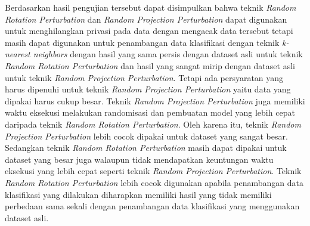 Berdasarkan hasil pengujian tersebut dapat disimpulkan bahwa teknik \textit{Random Rotation Perturbation} dan \textit{Random Projection Perturbation} dapat digunakan untuk menghilangkan privasi pada data dengan mengacak data tersebut tetapi masih dapat digunakan untuk penambangan data klasifikasi dengan teknik \textit{k-nearest neighbors} dengan hasil yang sama persis dengan dataset asli untuk teknik \textit{Random Rotation Perturbation} dan hasil yang sangat mirip dengan dataset asli untuk teknik \textit{Random Projection Perturbation}. Tetapi ada persyaratan yang harus dipenuhi untuk teknik \textit{Random Projection Perturbation} yaitu data yang dipakai harus cukup besar. Teknik \textit{Random Projection Perturbation} juga memiliki waktu eksekusi melakukan randomisasi dan pembuatan model yang lebih cepat daripada teknik \textit{Random Rotation Perturbation}. Oleh karena itu, teknik \textit{Random Projection Perturbation} lebih cocok dipakai untuk dataset yang sangat besar. Sedangkan teknik \textit{Random Rotation Perturbation} masih dapat dipakai untuk dataset yang besar juga walaupun tidak mendapatkan keuntungan waktu eksekusi yang lebih cepat seperti teknik \textit{Random Projection Perturbation}. Teknik \textit{Random Rotation Perturbation} lebih cocok digunakan apabila penambangan data klasifikasi yang dilakukan diharapkan memiliki hasil yang tidak memiliki perbedaan sama sekali dengan penambangan data klasifikasi yang menggunakan dataset asli. 